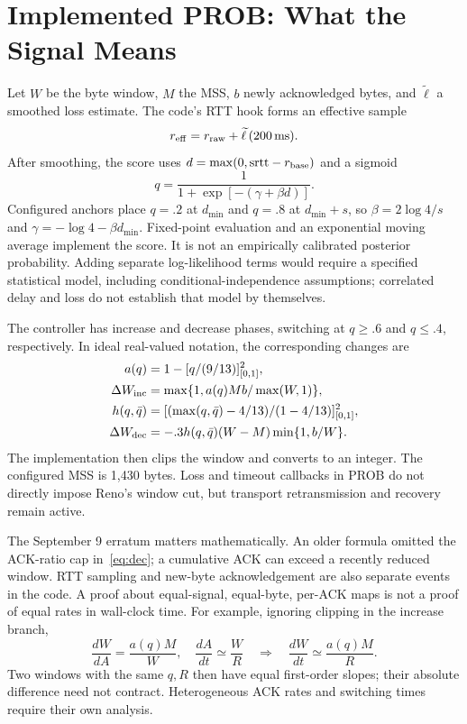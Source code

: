 \documentclass[conference,letterpaper]{IEEEtran}
\newcommand{\clip}[1]{[#1]_{[0,1]}}
\begin{document}
\section{Implemented PROB: What the Signal Means}
Let $W$ be the byte window, $M$ the MSS, $b$ newly acknowledged bytes, and $\widetilde\ell$ a smoothed loss estimate. The code's RTT hook forms an effective sample
\begin{equation}
r_{\rm eff}=r_{\rm raw}+\widetilde\ell\,(200\,\mathrm{ms}).
\end{equation}
After smoothing, the score uses $d=\max(0,\mathrm{srtt}-r_{\rm base})$ and a sigmoid
\begin{equation}
q=\frac{1}{1+\exp[-(\gamma+\beta d)]}.
\end{equation}
Configured anchors place $q=.2$ at $d_{\min}$ and $q=.8$ at $d_{\min}+s$, so $\beta=2\log4/s$ and $\gamma=-\log4-\beta d_{\min}$. Fixed-point evaluation and an exponential moving average implement the score. It is not an empirically calibrated posterior probability. Adding separate log-likelihood terms would require a specified statistical model, including conditional-independence assumptions; correlated delay and loss do not establish that model by themselves.

The controller has increase and decrease phases, switching at $q\ge.6$ and $q\le.4$, respectively. In ideal real-valued notation, the corresponding changes are
\begin{align}
a(q)&=1-\clip{q/(9/13)}^2,\\
\Delta W_{\rm inc}&=\max\{1,a(q)Mb/\max(W,1)\},\\
h(q,\bar q)&=\clip{(\max(q,\bar q)-4/13)/(1-4/13)}^2,\\
\Delta W_{\rm dec}&=-.3h(q,\bar q)(W-M)
\min\{1,b/W\}.\label{eq:dec}
\end{align}
The implementation then clips the window and converts to an integer. The configured MSS is 1,430 bytes. Loss and timeout callbacks in PROB do not directly impose Reno's window cut, but transport retransmission and recovery remain active.

The September 9 erratum matters mathematically. An older formula omitted the ACK-ratio cap in~\eqref{eq:dec}; a cumulative ACK can exceed a recently reduced window. RTT sampling and new-byte acknowledgement are also separate events in the code. A proof about equal-signal, equal-byte, per-ACK maps is not a proof of equal rates in wall-clock time. For example, ignoring clipping in the increase branch,
\begin{equation}
\frac{dW}{dA}=\frac{a(q)M}{W},\quad
\frac{dA}{dt}\simeq\frac WR
\quad\Longrightarrow\quad
\frac{dW}{dt}\simeq\frac{a(q)M}{R}.
\end{equation}
Two windows with the same $q,R$ then have equal first-order slopes; their absolute difference need not contract. Heterogeneous ACK rates and switching times require their own analysis.
\end{document}
